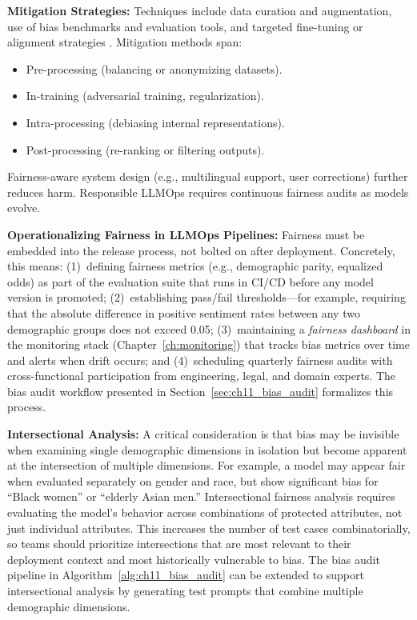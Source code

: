 \textbf{Mitigation Strategies:} Techniques include data curation and augmentation, use of bias benchmarks and evaluation tools, and targeted fine-tuning or alignment strategies \cite{aclanthology2023}. Mitigation methods span:
\begin{itemize}
    \item Pre-processing (balancing or anonymizing datasets).
    \item In-training (adversarial training, regularization).
    \item Intra-processing (debiasing internal representations).
    \item Post-processing (re-ranking or filtering outputs).
\end{itemize}
Fairness-aware system design (e.g., multilingual support, user corrections) further reduces harm. Responsible LLMOps requires continuous fairness audits as models evolve.

\textbf{Operationalizing Fairness in LLMOps Pipelines:} Fairness must be embedded into the release process, not bolted on after deployment. Concretely, this means: (1)~defining fairness metrics (e.g., demographic parity, equalized odds) as part of the evaluation suite that runs in CI/CD before any model version is promoted; (2)~establishing pass/fail thresholds---for example, requiring that the absolute difference in positive sentiment rates between any two demographic groups does not exceed 0.05; (3)~maintaining a \emph{fairness dashboard} in the monitoring stack (Chapter~\ref{ch:monitoring}) that tracks bias metrics over time and alerts when drift occurs; and (4)~scheduling quarterly fairness audits with cross-functional participation from engineering, legal, and domain experts. The bias audit workflow presented in Section~\ref{sec:ch11_bias_audit} formalizes this process.

\textbf{Intersectional Analysis:} A critical consideration is that bias may be invisible when examining single demographic dimensions in isolation but become apparent at the intersection of multiple dimensions. For example, a model may appear fair when evaluated separately on gender and race, but show significant bias for ``Black women'' or ``elderly Asian men.'' Intersectional fairness analysis requires evaluating the model's behavior across combinations of protected attributes, not just individual attributes. This increases the number of test cases combinatorially, so teams should prioritize intersections that are most relevant to their deployment context and most historically vulnerable to bias. The bias audit pipeline in Algorithm~\ref{alg:ch11_bias_audit} can be extended to support intersectional analysis by generating test prompts that combine multiple demographic dimensions.

